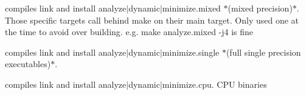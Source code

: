 
\begin{DoxyRefList}
\item[\label{deprecated__deprecated000001}%
\hypertarget{deprecated__deprecated000001}{}%
Page \hyperlink{md_Build_GPU}{Build Tinker-\/\-H\-P (G\-P\-U)} ]compiles link and install analyze$|$dynamic$|$minimize.mixed $\ast$(mixed precision)$\ast$. Those specific targets call behind {\ttfamily make} on their main target. Only used one at the time to avoid over building. e.\-g. {\ttfamily make analyze.\-mixed -\/j4} is fine

compiles link and install analyze$|$dynamic$|$minimize.single $\ast$(full single precision executables)$\ast$.

compiles link and install analyze$|$dynamic$|$minimize.cpu. C\-P\-U binaries
\end{DoxyRefList}